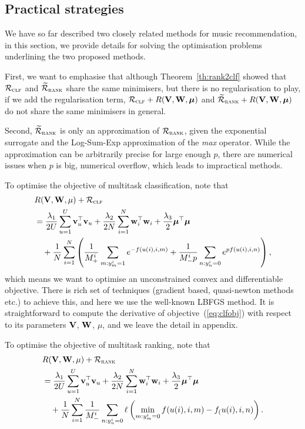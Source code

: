 \subsection{Practical strategies}

We have so far described two closely related methods for music recommendation,
in this section, we provide details for solving the optimisation problems underlining
the two proposed methods.

First, we want to emphasise that although Theorem~\ref{th:rank2clf} showed that
$\mathcal{R}_\textsc{clf}$ and $\widetilde{\mathcal{R}}_\textsc{rank}$ share the same minimisers, 
but there is no regularisation to play,
if we add the regularisation term, $\mathcal{R}_\textsc{clf} + R(\mathbf{V}, \mathbf{W}, \bm{\mu})$ and 
$\widetilde{\mathcal{R}}_\textsc{rank} + R(\mathbf{V}, \mathbf{W}, \bm{\mu})$ do not share the same minimisers in general.

Second, $\widetilde{\mathcal{R}}_\textsc{rank}$ is only an approximation of $\mathcal{R}_\textsc{rank}$,
given the exponential surrogate and the Log-Sum-Exp approximation of the \emph{max} operator.
While the approximation can be arbitrarily precise for large enough $p$, 
there are numerical issues when $p$ is big, \ie numerical overflow, 
which leads to impractical methods.

To optimise the objective of multitask classification, note that 
\begin{equation}
\label{eq:clfobj}
\begin{aligned}
& R(\mathbf{V}, \mathbf{W}, \mu) + \mathcal{R}_\textsc{clf} \\
&= \frac{\lambda_1}{2U} \sum_{u=1}^U \mathbf{v}_u^\top \mathbf{v}_u + \frac{\lambda_2}{2N} \sum_{i=1}^N \mathbf{w}_i^\top \mathbf{w}_i + \frac{\lambda_3}{2} \bm{\mu}^\top \bm{\mu} \\
& \quad
   + \frac{1}{N} \sum_{i=1}^N \left( \frac{1}{M_+^i} \sum_{m: y_m^i = 1} e^{-f(u(i), i,m)} + \frac{1}{M_-^i p} \sum_{n: y_n^i = 0} e^{p f(u(i), i,n)} \right),
\end{aligned}
\end{equation}
which means we want to optimise an unconstrained convex and differentiable objective.
There is rich set of techniques (\eg gradient based, quasi-newton methods etc.) to achieve this, and here we use the well-known LBFGS method.
It is straightforward to compute the derivative of objective~(\ref{eq:clfobj}) with respect to its parameters $\mathbf{V}$, $\mathbf{W}$, $\mu$,
and we leave the detail in appendix.

To optimise the objective of multitask ranking, note that
\begin{equation}
\label{eq:rankobj}
\begin{aligned}
& R(\mathbf{V}, \mathbf{W}, \mu) + \mathcal{R}_\textsc{rank} \\
&= \frac{\lambda_1}{2U} \sum_{u=1}^U \mathbf{v}_u^\top \mathbf{v}_u + \frac{\lambda_2}{2N} \sum_{i=1}^N \mathbf{w}_i^\top \mathbf{w}_i + \frac{\lambda_3}{2} \bm{\mu}^\top \bm{\mu} \\
& \quad
   + \frac{1}{N} \sum_{i=1}^N \frac{1}{M_-^i} \sum_{n: y_n^i = 0} \ell \left( \min_{m: y_m^i = 0} f(u(i), i, m) - f_(u(i), i, n) \right).
\end{aligned}
\end{equation}

